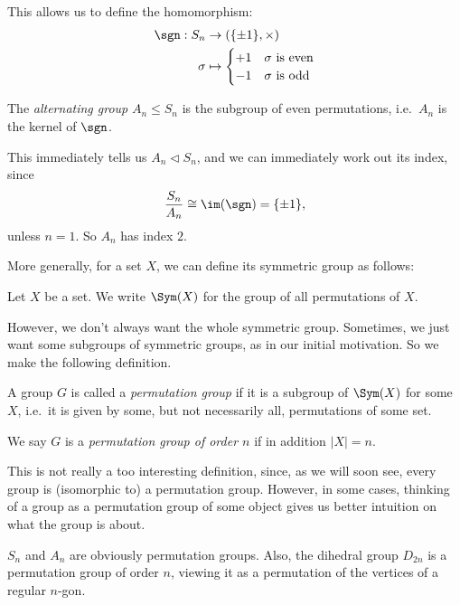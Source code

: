 \documentclass[a4paper]{article}
\begin{document}
This allows us to define the homomorphism:\index{$\sgn$}
\begin{align*}
  \sgn: S_n &\to (\{\pm 1\}, \times)\\
  \sigma &\mapsto
  \begin{cases}
    +1 & \sigma\text{ is even}\\
    -1 & \sigma\text{ is odd}
  \end{cases}
\end{align*}

\begin{defi}
  The \emph{alternating group} $A_n \leq S_n$ is the subgroup of even permutations, i.e.\ $A_n$ is the kernel of $\sgn$.
\end{defi}

This immediately tells us $A_n \lhd S_n$, and we can immediately work out its index, since
\[
  \frac{S_n}{A_n} \cong \im (\sgn) = \{\pm 1\},
\]
unless $n = 1$. So $A_n$ has index $2$.

More generally, for a set $X$, we can define its symmetric group as follows:
\begin{defi}
  Let $X$ be a set. We write $\Sym(X)$ for the group of all permutations of $X$.
\end{defi}

However, we don't always want the whole symmetric group. Sometimes, we just want some subgroups of symmetric groups, as in our initial motivation. So we make the following definition.

\begin{defi}
  A group $G$ is called a \emph{permutation group} if it is a subgroup of $\Sym(X)$ for some $X$, i.e.\ it is given by some, but not necessarily all, permutations of some set.

  We say $G$ is a \emph{permutation group of order $n$} if in addition $|X| = n$.
\end{defi}
This is not really a too interesting definition, since, as we will soon see, every group is (isomorphic to) a permutation group. However, in some cases, thinking of a group as a permutation group of some object gives us better intuition on what the group is about.

\begin{eg}
  $S_n$ and $A_n$ are obviously permutation groups. Also, the dihedral group $D_{2n}$ is a permutation group of order $n$, viewing it as a permutation of the vertices of a regular $n$-gon.
\end{eg}
\end{document}
